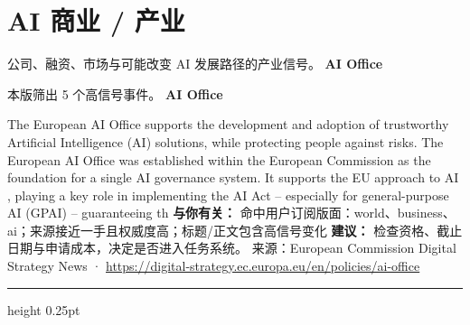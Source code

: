 \documentclass[10.5pt]{ctexart}
\begin{document}
\section*{AI 商业 / 产业}
{\color{ormuted} 公司、融资、市场与可能改变 AI 发展路径的产业信号。}
\vspace{2mm}
{\LARGE\bfseries AI Office}\par
\vspace{1mm}
{\color{ormuted} 本版筛出 5 个高信号事件。}
\vspace{3mm}
{\Large\bfseries AI Office}\par
The European AI Office supports the development and adoption of trustworthy Artificial Intelligence (AI) solutions, while protecting people against risks. The European AI Office was established within the European Commission as the foundation for a single AI governance system. It supports the EU approach to AI , playing a key role in implementing the AI Act – especially for general-purpose AI (GPAI) – guaranteeing th
\textbf{与你有关：} 命中用户订阅版面：world、business、ai；来源接近一手且权威度高；标题/正文包含高信号变化
\textbf{建议：} 检查资格、截止日期与申请成本，决定是否进入任务系统。
{\footnotesize\color{ormuted} 来源：European Commission Digital Strategy News · \url{https://digital-strategy.ec.europa.eu/en/policies/ai-office}}
\vspace{4mm}
\hrule height 0.25pt
\vspace{3mm}
\end{document}
